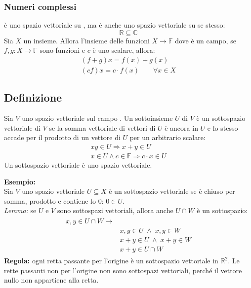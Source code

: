 \documentclass[italian]{article}
\newcommand{\ins}[1]{\text{$\mathbb{#1}$}}
\begin{document}
\subsubsection{Numeri complessi}
\ins{C} è uno spazio vettoriale su \ins{R}, ma è anche uno spazio vettoriale su se stesso:
\[
	\ins{R} \subseteq \ins{C}
\]
Sia $X$ un insieme. Allora l'insieme delle funzioni $X \to \ins{F}$ dove \ins{F} è un campo, se $f,g: X \to \ins{F}$ sono funzioni e $c$ è uno scalare, allora:
\begin{gather*}
	(f+g)x = f(x) + g(x)\\
	(cf)x = c\cdot f(x) \qquad \forall x \in X
\end{gather*}
\subsection{Definizione}
Sia $V$ uno spazio vettoriale sul campo \ins{F}. Un sottoinsieme
$U$ di $V$ è un sottospazio vettoriale di $V$ se la somma vettoriale di vettori di
$U$ è ancora in $U$ e lo stesso accade per il prodotto di un vettore di $U$ per un
arbitrario scalare:
\begin{gather*}
	xy \in U \Rightarrow x+y \in U \\
	x\in U \land c\in \ins{F} \Rightarrow c\cdot x \in U
\end{gather*}
Un sottospazio vettoriale è uno spazio vettoriale.

\newpage
\noindent
\textbf{Esempio:}\\
Sia $V$ uno spazio vettoriale $U \subseteq X$ è un sottospazio vettoriale se è chiuso per somma, prodotto e contiene lo 0: $0 \in U$.\\[2mm]
\textit{Lemma:} se $U$ e $V$ sono sottospazi vettoriali, allora anche $U \cap W$ è un sottospazio:
\begin{gather*}
	\begin{split}
		x,y \in U\cap W \to& \\
		& x,y \in U \;\land\; x,y \in W \\
		& x+y \in U \;\land\; x+y \in W \\
		& x+y \in U\cap W		
	\end{split}
\end{gather*}
\textbf{Regola:} ogni retta passante per l'origine è un sottospazio vettoriale in $\ins{R}^2$. Le rette passanti non per l'origine non sono sottospazi vettoriali, perché il vettore nullo non appartiene alla retta.
\end{document}
